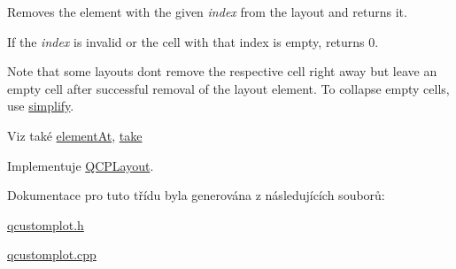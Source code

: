 Removes the element with the given {\itshape index} from the layout and returns it. 

If the {\itshape index} is invalid or the cell with that index is empty, returns 0.

Note that some layouts don\textquotesingle{}t remove the respective cell right away but leave an empty cell after successful removal of the layout element. To collapse empty cells, use \hyperlink{classQCPLayoutGrid_a08bba60e4acd20165526a8fd7f986b58}{simplify}.

\begin{DoxySeeAlso}{Viz také}
\hyperlink{classQCPLayoutGrid_a26849ee5c47b4c940e8d65e8462f1065}{element\+At}, \hyperlink{classQCPLayoutGrid_a666a9fe9e92054436f9b66eba25cca0c}{take} 
\end{DoxySeeAlso}


Implementuje \hyperlink{classQCPLayout_a5a79621fa0a6eabb8b520cfc04fb601a}{Q\+C\+P\+Layout}.



Dokumentace pro tuto třídu byla generována z následujících souborů\+:\begin{DoxyCompactItemize}
\item 
\hyperlink{qcustomplot_8h}{qcustomplot.\+h}\item 
\hyperlink{qcustomplot_8cpp}{qcustomplot.\+cpp}\end{DoxyCompactItemize}
